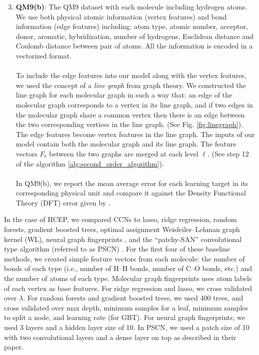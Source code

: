 \documentclass[sigchi]{acmart}
\theoremstyle{definition}
\theoremstyle{theorem}
\theoremstyle{corollary}
\theoremstyle{lemma}
\theoremstyle{remark}
\theoremstyle{prop}
\begin{document}
\begin{enumerate}
\setcounter{enumi}{2}
\item \textbf{QM9(b)}: The QM9 dataset with each molecule including hydrogen atoms. We use both physical atomic information (vertex features) and bond information (edge features) including: atom type, atomic number, acceptor, donor, aromatic, hybridization, number of hydrogens, Euclidean distance and Coulomb distance between pair of atoms. All the information is encoded in a vectorized format. \\ \\
To include the edge features into our model along with the vertex features, we used the concept of a \textit{line graph} from graph theory. We constructed the line graph for each molecular graph in such a way that: an edge of the molecular graph corresponds to a vertex in its line graph, and if two edges in the molecular graph share a common vertex then there is an edge between the two corresponding vertices in the line graph. (See Fig. \ref{fig:linegraph}). The edge features become vertex features in the line graph. The inputs of our model contain both the molecular graph and its line graph. The feature vectors $F_\ell$ between the two graphs are merged at each level $\ell$. (See step 12 of the algorithm \ref{alg:second_order_algorithm}). \\ \\
In QM9(b), we report the mean average error for each learning target in its corresponding physical unit and compare it against the Density Functional Theory (DFT) error given by \citep{Faber2017}. 
\end{enumerate}
In the case of HCEP, we compared CCNs to lasso, ridge regression, random forests, gradient boosted trees, optimal assignment Weisfeiler--Lehman graph kernel \citep{Kriege16} (WL), neural graph fingerprints \citep{Duvenaud2015}, and the ``patchy-SAN'' convolutional type algorithm (referred to as PSCN) \citep{Niepert2016}. For the first four of these baseline methods, we created simple feature vectors from each molecule: the number of bonds of each type (i.e., number of H--H bonds, number of C--O bonds, etc.) and the number of atoms of each type. Molecular graph fingerprints uses atom labels of each vertex as base features. For ridge regression and lasso, we cross validated over $\lambda$. For random forests and gradient boosted trees, we used 400 trees, and cross validated over max depth, minimum samples for a leaf, minimum samples to split a node, and learning rate (for GBT). For neural graph fingerprints, we used 3 layers and a hidden layer size of 10. In PSCN, we used a patch size of 10 with two convolutional layers and a dense layer on top as described in their paper. \\ \\
\end{document}
